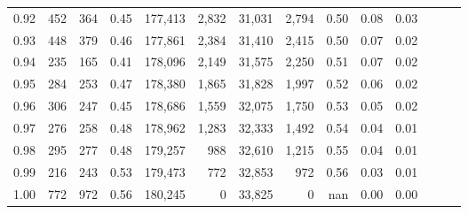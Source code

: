 \begin{tabular}{rrrrrrrrrrrrrr}
0.92 &    452 &  364 &  0.45 &  177,413 &    2,832 &  31,031 &   2,794 &  0.50 &  0.08 &      0.03 \\
0.93 &    448 &  379 &  0.46 &  177,861 &    2,384 &  31,410 &   2,415 &  0.50 &  0.07 &      0.02 \\
0.94 &    235 &  165 &  0.41 &  178,096 &    2,149 &  31,575 &   2,250 &  0.51 &  0.07 &      0.02 \\
0.95 &    284 &  253 &  0.47 &  178,380 &    1,865 &  31,828 &   1,997 &  0.52 &  0.06 &      0.02 \\
0.96 &    306 &  247 &  0.45 &  178,686 &    1,559 &  32,075 &   1,750 &  0.53 &  0.05 &      0.02 \\
0.97 &    276 &  258 &  0.48 &  178,962 &    1,283 &  32,333 &   1,492 &  0.54 &  0.04 &      0.01 \\
0.98 &    295 &  277 &  0.48 &  179,257 &      988 &  32,610 &   1,215 &  0.55 &  0.04 &      0.01 \\
0.99 &    216 &  243 &  0.53 &  179,473 &      772 &  32,853 &     972 &  0.56 &  0.03 &      0.01 \\
1.00 &    772 &  972 &  0.56 &  180,245 &        0 &  33,825 &       0 &   nan &  0.00 &      0.00 \\
\bottomrule
\end{tabular}
